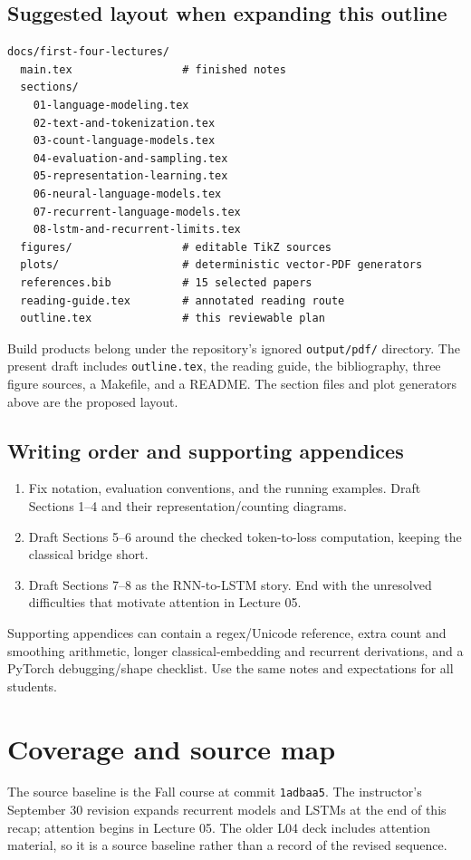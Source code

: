 \documentclass[11pt,a4paper]{article}
\begin{document}
\subsection{Suggested layout when expanding this outline}
\begin{verbatim}
docs/first-four-lectures/
  main.tex                 # finished notes
  sections/
    01-language-modeling.tex
    02-text-and-tokenization.tex
    03-count-language-models.tex
    04-evaluation-and-sampling.tex
    05-representation-learning.tex
    06-neural-language-models.tex
    07-recurrent-language-models.tex
    08-lstm-and-recurrent-limits.tex
  figures/                 # editable TikZ sources
  plots/                   # deterministic vector-PDF generators
  references.bib           # 15 selected papers
  reading-guide.tex        # annotated reading route
  outline.tex              # this reviewable plan
\end{verbatim}
Build products belong under the repository's ignored \texttt{output/pdf/}
directory. The present draft includes \texttt{outline.tex}, the reading guide,
the bibliography, three figure sources, a Makefile, and a README.
The section files and plot generators above are the proposed layout.

\subsection{Writing order and supporting appendices}
\begin{enumerate}
  \item Fix notation, evaluation conventions, and the running examples.
  Draft Sections 1--4 and their representation/counting diagrams.
  \item Draft Sections 5--6 around the checked token-to-loss computation,
  keeping the classical bridge short.
  \item Draft Sections 7--8 as the RNN-to-LSTM story. End with the
  unresolved difficulties that motivate attention in Lecture 05.
\end{enumerate}
Supporting appendices can contain a regex/Unicode reference, extra
count and smoothing arithmetic, longer classical-embedding and recurrent
derivations, and a PyTorch debugging/shape checklist. Use the same notes and
expectations for all students.

\clearpage
\section{Coverage and source map}
The source baseline is the Fall course at commit \texttt{1adbaa5}.
The instructor's September 30 revision expands recurrent models and LSTMs
at the end of this recap; attention begins in Lecture 05. The older L04
deck includes attention material, so it is a source baseline rather than
a record of the revised sequence.
\end{document}
